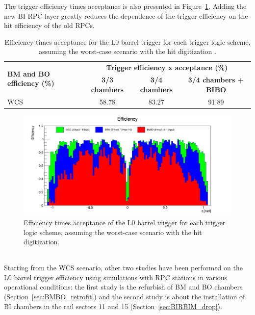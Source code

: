 The trigger efficiency times acceptance is also presented in Figure~\ref{fig:h_eff}. 
Adding the new BI RPC layer greatly reduces the dependence of the trigger efficiency on the hit efficiency of the old RPCs.
\begin{table}[h]
		\small
\begin{tabular}{l|c|c|c}
	\hline
	\multirow{2}{*}{\textbf{BM and BO efficiency (\%)}} & \multicolumn{3}{c}{\textbf{Trigger efficiency x acceptance (\%)}}\\
	\cline{2-4}   
	& \textbf{3/3 chambers} & \textbf{3/4 chambers} & \textbf{3/4 chambers + BIBO}\\
	\hline 
	WCS 												& 58.78 				& 83.27 		& 91.89\\
	\hline 
\end{tabular} 
\caption{Efficiency times acceptance for the L0 barrel trigger for each trigger logic scheme, assuming the worst-case scenario with the hit digitization  .} 
\label{tab:eff_x_acc_wcs}
\end{table} 
\begin{figure}[!h]
	\centering
	\includegraphics[width=1.1\textwidth]{Chapters/CH3/figures/h_eff}
	\caption{Efficiency times acceptance of the L0 barrel trigger for each trigger logic scheme, assuming the worst-case scenario with the hit digitization.}
	\label{fig:h_eff}
\end{figure}
\\Starting from the WCS scenario, other two studies have been performed on the L0 barrel trigger 
efficiency using simulations with RPC stations in various operational conditions: the first study is the  refurbish of BM and BO chambers (Section~\ref{sec:BMBO_retrofit}) and the second study is about the installation of BI chambers in the rail sectors 11 and 15 (Section~\ref{sec:BIRBIM_drop}).

